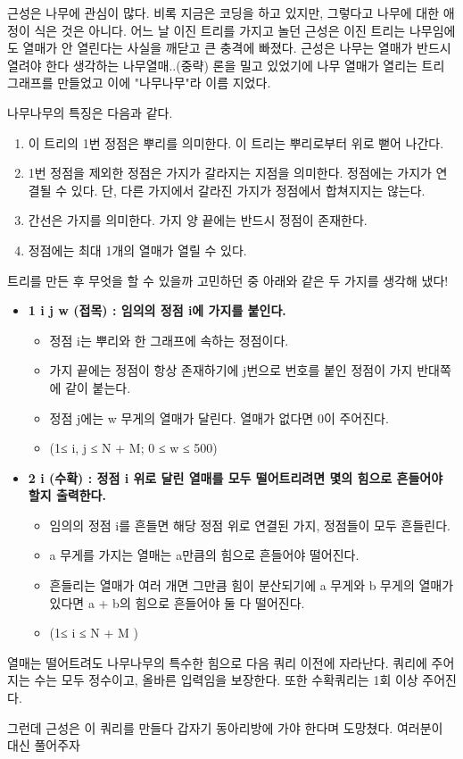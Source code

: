 근성은 나무에 관심이 많다.  
비록 지금은 코딩을 하고 있지만, 그렇다고 나무에 대한 애정이 식은 것은 아니다.
어느 날 이진 트리를 가지고 놀던 근성은 이진 트리는 나무임에도 열매가 안 열린다는 사실을 깨닫고 큰 충격에 빠졌다. 
근성은 나무는 열매가 반드시 열려야 한다 생각하는 나무열매..(중략) 론을 밀고 있었기에 나무 열매가 열리는 트리 그래프를 만들었고 이에 "나무나무"라 이름 지었다.

나무나무의 특징은 다음과 같다.
\begin{enumerate}
\item 이 트리의 1번 정점은 뿌리를 의미한다. 이 트리는 뿌리로부터 위로 뻗어 나간다.
\item 1번 정점을 제외한 정점은 가지가 갈라지는 지점을 의미한다. 정점에는 가지가 연결될 수 있다. 단, 다른 가지에서 갈라진 가지가 정점에서 합쳐지지는 않는다.
\item 간선은 가지를 의미한다. 가지 양 끝에는 반드시 정점이 존재한다.
\item 정점에는 최대 1개의 열매가 열릴 수 있다.
\end{enumerate}

트리를 만든 후 무엇을 할 수 있을까 고민하던 중 아래와 같은 두 가지를 생각해 냈다!
\begin{itemize}
  \item \bf{1 i j w  (접목)} : 임의의 정점 i에 가지를 붙인다.
    \begin{itemize}
      \item 정점 i는 뿌리와 한 그래프에 속하는 정점이다.
      \item 가지 끝에는 정점이 항상 존재하기에 j번으로 번호를 붙인 정점이 가지 반대쪽에 같이 붙는다.
      \item 정점 j에는 w 무게의 열매가 달린다. 열매가 없다면 0이 주어진다.
      \item (1≤ i, j ≤ N + M; 0 ≤ w ≤ 500)
    \end{itemize}
  \item \bf{2 i (수확)} : 정점 i 위로 달린 열매를 모두 떨어트리려면 몇의 힘으로 흔들어야 할지 출력한다.
    \begin{itemize}
      \item 임의의 정점 i를 흔들면 해당 정점 위로 연결된 가지, 정점들이 모두 흔들린다.  
      \item a 무게를 가지는 열매는 a만큼의 힘으로 흔들어야 떨어진다.
      \item 흔들리는 열매가 여러 개면 그만큼 힘이 분산되기에 a 무게와 b 무게의 열매가 있다면 a + b의 힘으로 흔들어야 둘 다 떨어진다.
      \item (1≤ i ≤ N + M )
    \end{itemize}
\end{itemize}


열매는 떨어트려도 나무나무의 특수한 힘으로 다음 쿼리 이전에 자라난다.
쿼리에 주어지는 수는 모두 정수이고, 올바른 입력임을 보장한다. 또한 수확쿼리는 1회 이상 주어진다.


그런데 근성은 이 쿼리를 만들다 갑자기 동아리방에 가야 한다며 도망쳤다.
여러분이 대신 풀어주자
